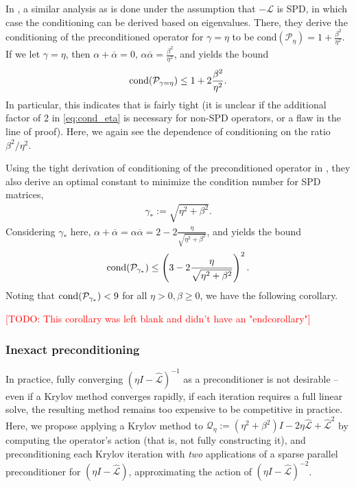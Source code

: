 \documentclass[review]{siamart}
\makeatletter
\newcommand{\todo}[1]{\textcolor{red}{[TODO\@: #1]}}
\makeatother
\begin{document}
In \cite{exh}, a similar analysis as  is done under the assumption
that $-\mathcal{L}$ is SPD, in which case the conditioning can be derived based on
eigenvalues. There, they derive the conditioning of the preconditioned
operator for $\gamma = \eta$ to be cond$(\mathcal{P}_\eta) = 1 + \tfrac{\beta^2}{\eta^2}$.
If we let $\gamma = \eta$, then $\alpha+\overline{\alpha} = 0$, $\alpha\overline{\alpha} =
\frac{\beta^2}{\eta^2}$, and  yields the bound
%
\begin{align}\label{eq:cond_eta}
\textnormal{cond}(\mathcal{P}_{\gamma = \eta}) \leq 1 + 2\frac{\beta^2}{\eta^2}.
\end{align}
%
In particular, this indicates that  is fairly tight (it is unclear
if the additional factor of 2 in \eqref{eq:cond_eta} is necessary for non-SPD
operators, or a flaw in the line of proof). Here, we again see the dependence
of conditioning on the ratio $\beta^2/\eta^2$.

Using the tight derivation of conditioning of the preconditioned operator in
\cite{exh}, they also derive an optimal constant to minimize the condition
number for SPD matrices, 
%
\begin{align}\label{eq:gam_opt} 
\gamma _* := \sqrt{\eta^2+\beta^2}.
\end{align}
%
Considering $\gamma_*$ here, $\alpha+\overline{\alpha} = \alpha\overline{\alpha} =
2 - 2\frac{\eta}{\sqrt{\eta^2+\beta^2}}$, and  yields the bound
%
\begin{align*}
\textnormal{cond}(\mathcal{P}_{\gamma_*})
	\leq \left(3 - 2\frac{\eta}{\sqrt{\eta^2+\beta^2}}\right)^2.
\end{align*}
%
Noting that $\textnormal{cond}(\mathcal{P}_{\gamma_*}) < 9$ for all $\eta>0,
\beta\geq 0$, we have the following corollary.

%
\begin{corollary}
\todo{This corollary was left blank and didn't have an "end{corollary}"}
\end{corollary}




\subsubsection{Inexact preconditioning}

In practice, fully converging $(\eta I - \widehat{\mathcal{L}})^{-1}$ as a preconditioner
is not desirable --  even if a Krylov method converges rapidly, if each iteration requires
a full linear solve, the resulting method remains too expensive to be competitive in practice.
Here, we propose
applying a Krylov method to $\mathcal{Q}_\eta:=(\eta^2+\beta^2)I - 2\eta\widehat{\mathcal{L}} +
\widehat{\mathcal{L}}^2$ by computing the operator's action (that is, not fully constructing
it), and preconditioning each Krylov iteration with \textit{two} applications of a sparse
parallel preconditioner for $(\eta I - \widehat{\mathcal{L}})$, approximating the action
of $(\eta I - \widehat{\mathcal{L}})^{-2}$.
\end{document}
